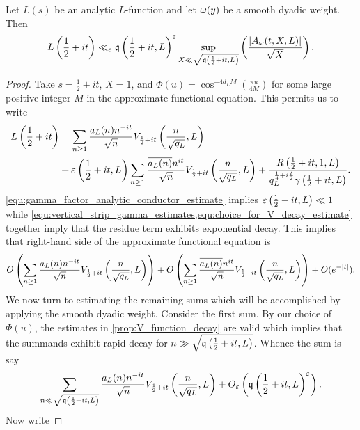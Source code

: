     \begin{theorem}\label{thm:critical_line_estimate}
      Let \(L(s)\) be an analytic \(L\)-function and let \(\omega(y)\) be a smooth dyadic weight. Then
      \[
        L\left(\frac{1}{2}+it\right) \ll_{\varepsilon} \mathfrak{q}\left(\frac{1}{2}+it,L\right)^{\varepsilon}\sup_{X \ll \sqrt{\mathfrak{q}\left(\frac{1}{2}+it,L\right)}}\left(\frac{|A_{\omega}(t,X,L)|}{\sqrt{X}}\right).
      \]
    \end{theorem}
    \begin{proof}
      Take \(s = \frac{1}{2}+it\), \(X = 1\), and \(\Phi(u) = \cos^{-4d_{L}M}\left(\frac{\pi u}{4M}\right)\) for some large positive integer \(M\) in the approximate functional equation. This permits us to write
      \begin{align*}
        L\left(\frac{1}{2}+it\right) &= \sum_{n \ge 1}\frac{a_{L}(n)n^{-it}}{\sqrt{n}}V_{\frac{1}{2}+it}\left(\frac{n}{\sqrt{q_{L}}},L\right) \\
        &+ \varepsilon\left(\frac{1}{2}+it,L\right)\sum_{n \ge 1}\frac{\overline{a_{L}(n)}n^{it}}{\sqrt{n}}V_{\frac{1}{2}+it}\left(\frac{n}{\sqrt{q_{L}}},L\right)+\frac{R\left(\frac{1}{2}+it,1,L\right)}{q_{L}^{\frac{1}{4}+i\frac{t}{2}}\gamma\left(\frac{1}{2}+it,L\right)}.
      \end{align*}
      \cref{equ:gamma_factor_analytic_conductor_estimate} implies \(\varepsilon\left(\frac{1}{2}+it,L\right) \ll 1\) while \cref{equ:vertical_strip_gamma_estimates,equ:choice_for_V_decay_estimate} together imply that the residue term exhibits exponential decay. This implies that right-hand side of the approximate functional equation is
      \begin{align*}
        O\left(\sum_{n \ge 1}\frac{a_{L}(n)n^{-it}}{\sqrt{n}}V_{\frac{1}{2}+it}\left(\frac{n}{\sqrt{q_{L}}},L\right)\right)+O\left(\sum_{n \ge 1}\frac{\overline{a_{L}(n)}n^{it}}{\sqrt{n}}V_{\frac{1}{2}-it}\left(\frac{n}{\sqrt{q_{L}}},L\right)\right)+O(e^{-|t|}).
      \end{align*}
      We now turn to estimating the remaining sums which will be accomplished by applying the smooth dyadic weight. Consider the first sum. By our choice of \(\Phi(u)\), the estimates in \cref{prop:V_function_decay} are valid which implies that the summands exhibit rapid decay for \(n \gg \sqrt{\mathfrak{q}\left(\frac{1}{2}+it,L\right)}\). Whence the sum is say
      \[
        \sum_{n \ll \sqrt{\mathfrak{q}\left(\frac{1}{2}+it,L\right)}}\frac{a_{L}(n)n^{-it}}{\sqrt{n}}V_{\frac{1}{2}+it}\left(\frac{n}{\sqrt{q_{L}}},L\right)+O_{\varepsilon}\left(\mathfrak{q}\left(\frac{1}{2}+it,L\right)^{\varepsilon}\right).
      \]
      Now write 

\end{proof}
